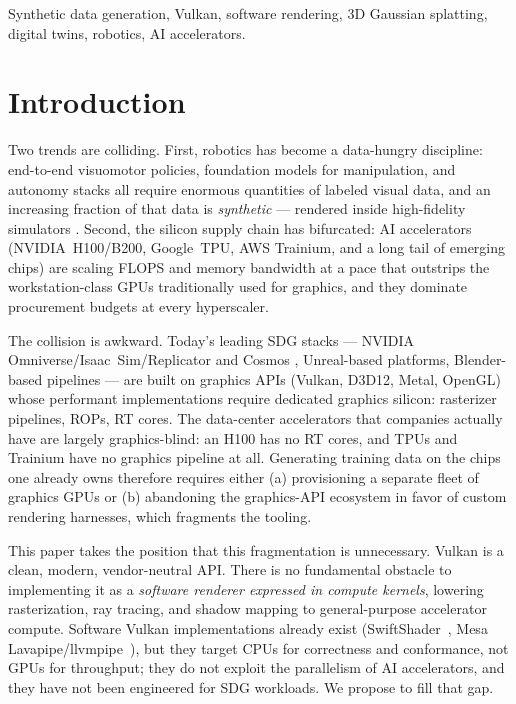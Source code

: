 \documentclass[10pt,journal]{IEEEtran}
\begin{document}
\begin{IEEEkeywords}
Synthetic data generation, Vulkan, software rendering, 3D Gaussian splatting,
digital twins, robotics, AI accelerators.
\end{IEEEkeywords}

\section{Introduction}

Two trends are colliding. First, robotics has become a data-hungry
discipline: end-to-end visuomotor policies, foundation models for
manipulation, and autonomy stacks all require enormous quantities of
labeled visual data, and an increasing fraction of that data is
\emph{synthetic} --- rendered inside high-fidelity simulators
\cite{tobin2017domain,greff2022kubric,denninger2019blenderproc,deitke2022procthor}.
Second, the silicon supply chain has bifurcated: AI accelerators
(NVIDIA~H100\slash B200, Google~TPU, AWS Trainium, and a long tail of
emerging chips) are scaling FLOPS and memory bandwidth at a pace that
outstrips the workstation-class GPUs traditionally used for graphics, and
they dominate procurement budgets at every hyperscaler.

The collision is awkward. Today's leading SDG stacks --- NVIDIA
Omniverse\slash Isaac~Sim\slash Replicator and Cosmos
\cite{nvidia2024cosmos}, Unreal-based platforms, Blender-based pipelines
\cite{denninger2019blenderproc,greff2022kubric} --- are built on graphics
APIs (Vulkan, D3D12, Metal, OpenGL) whose performant implementations
require dedicated graphics silicon: rasterizer pipelines, ROPs, RT cores.
The data-center accelerators that companies actually have are largely
graphics-blind: an H100 has no RT cores, and TPUs and Trainium have no
graphics pipeline at all. Generating training data on the chips one
already owns therefore requires either (a) provisioning a separate fleet
of graphics GPUs or (b) abandoning the graphics-API ecosystem in favor of
custom rendering harnesses, which fragments the tooling.

This paper takes the position that this fragmentation is unnecessary.
Vulkan is a clean, modern, vendor-neutral API. There is no fundamental
obstacle to implementing it as a \emph{software renderer expressed in
compute kernels}, lowering rasterization, ray tracing, and shadow mapping
to general-purpose accelerator compute. Software Vulkan implementations
already exist (SwiftShader~\cite{swiftshader}, Mesa
Lavapipe\slash llvmpipe~\cite{mesa-lavapipe}), but they target CPUs for
correctness and conformance, not GPUs for throughput; they do not exploit
the parallelism of AI accelerators, and they have not been engineered for
SDG workloads. We propose to fill that gap.
\end{document}
